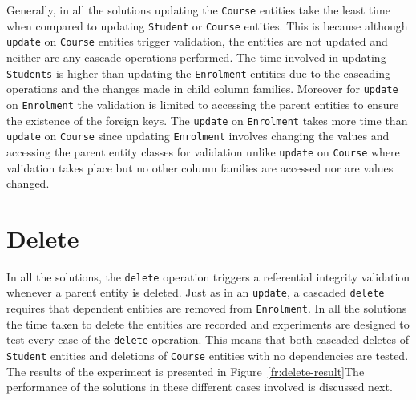 Generally, in all the solutions updating the \texttt{Course} entities take the
least time when compared to updating \texttt{Student} or \texttt{Course}
entities. This is because although \texttt{update} on \texttt{Course} entities trigger
validation, the entities are not updated and neither are any cascade operations
performed.
The time involved in updating \texttt{Students} is higher than updating the
\texttt{Enrolment} entities due to the cascading operations  and
the changes made in child column families.
Moreover for \texttt{update} on \texttt{Enrolment} the validation is limited to
accessing the parent entities to ensure the existence of the foreign keys.
The \texttt{update} on \texttt{Enrolment} takes more time than \texttt{update}
on \texttt{Course} since updating \texttt{Enrolment} involves changing the
values and accessing the parent entity classes for
validation unlike \texttt{update} on
\texttt{Course} where
validation takes place but no other column families are accessed nor are values
changed. 





\section{Delete}\label{sr:delete}
In all the solutions, the \texttt{delete} operation triggers a referential
integrity validation whenever a parent entity is deleted. Just as in an
\texttt{update}, a cascaded 
\texttt{delete} requires that dependent entities are removed from
\texttt{Enrolment}.
In all the solutions the time taken to delete the entities  are recorded and
experiments are designed to test every case of the \texttt{delete} operation.
This means that both cascaded deletes of \texttt{Student} entities and deletions
of
\texttt{Course} entities with no dependencies are tested. The results of the
experiment is presented in Figure~\ref{fr:delete-result}The performance of the
solutions in these different cases involved is discussed next.

